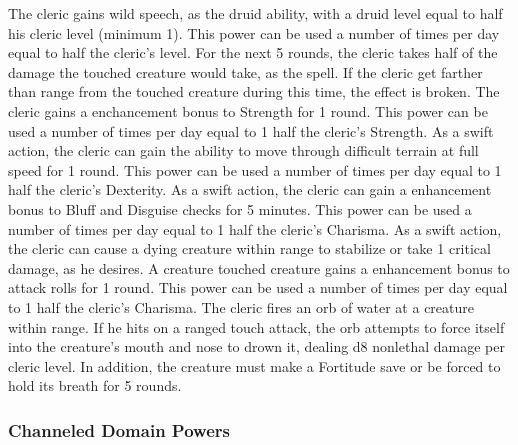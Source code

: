  The cleric gains wild speech, as the druid ability, with a druid level equal to half his cleric level (minimum 1). This power can be used a number of times per day equal to half the cleric's level.
 For the next 5 rounds, the cleric takes half of the damage the touched creature would take, as the  spell. If the cleric get farther than \rngmed range from the touched creature during this time, the effect is broken.
 The cleric gains a  enchancement bonus to Strength for 1 round. \bonusscalingdescription This power can be used a number of times per day equal to 1 \add half the cleric's Strength.
 As a swift action, the cleric can gain the ability to move through difficult terrain at full speed for 1 round. This power can be used a number of times per day equal to 1 \add half the cleric's Dexterity.
 As a swift action, the cleric can gain a  enhancement bonus to Bluff and Disguise checks for 5 minutes. This power can be used a number of times per day equal to 1 \add half the cleric's Charisma.
 As a swift action, the cleric can cause a dying creature within \rngmed range to stabilize or take 1 critical damage, as he desires.
 A creature touched creature gains a  enhancement bonus to attack rolls for 1 round. \bonusscalingdescription This power can be used a number of times per day equal to 1 \add half the cleric's Charisma.
 The cleric fires an orb of water at a creature within \rngclose range. If he hits on a ranged touch attack, the orb attempts to force itself into the creature's mouth and nose to drown it, dealing d8 nonlethal damage  per cleric level. In addition, the creature must make a Fortitude save or be forced to hold its breath for 5 rounds.

\subsubsection{Channeled Domain Powers}\label{Channeled Domain Powers}


